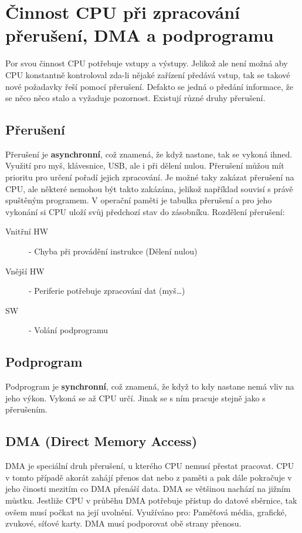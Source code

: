 \section{Činnost CPU při zpracování přerušení, DMA a podprogramu}
\label{sec:cpu-preruseni}
Por svou činnost CPU potřebuje vstupy a výstupy.
Jelikož ale není možná aby CPU konstantně kontroloval zda-li nějaké zařízení předává vstup, tak se takové nové požadavky řeší pomocí přerušení.
Defakto se jedná o předání informace, že se něco něco stalo a vyžaduje pozornost.
Existují různé druhy přerušení.
\subsection{Přerušení}
Přerušení je \textbf{asynchronní}, což znamená, že když nastane, tak se vykoná ihned.
Využití pro myš, klávesnice, USB, ale i při dělení nulou.
Přerušení můžou mít prioritu pro určení pořadí jejich zpracování.
Je možné taky zakázat přerušení na CPU, ale některé nemohou být takto zakázána, jelikož například souvisí s právě spuštěným programem.
V operační paměti je tabulka přerušení a pro jeho vykonání si CPU uloží svůj předchozí stav do zásobníku.
Rozdělení přerušení:\\
\begin{description}
  \item[Vnitřní HW]- Chyba při provádění instrukce (Dělení nulou)
  \item[Vnější HW]- Periferie potřebuje zpracování dat (myš\dots)
  \item[SW]- Volání podprogramu
\end{description}
\subsection{Podprogram}
Podprogram je \textbf{synchronní}, což znamená, že když to kdy nastane nemá vliv na jeho výkon.
Vykoná se až CPU určí.
Jinak se s ním pracuje stejně jako s přerušením.
\subsection{DMA (Direct Memory Access)}
DMA je speciální druh přerušení, u kterého CPU nemusí přestat pracovat.
CPU v tomto případě akorát zahájí přenos dat nebo z paměti a pak dále pokračuje v jeho činosti mezitím co DMA přenáší data.
DMA se většinou nachází na jižním můstku.
Jestliže CPU v průběhu DMA potřebuje přístup do datové sběrnice, tak ovšem musí počkat na její uvolnění.
Využíváno pro: Paměťová média, grafické, zvukové, síťové karty.
DMA musí podporovat obě strany přenosu.
